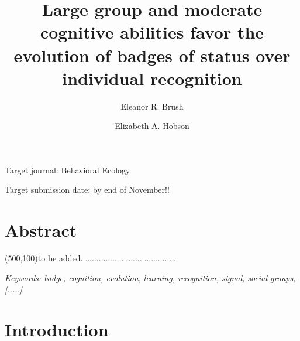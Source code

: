 

\noindent
\title{Large group and moderate cognitive abilities favor the evolution of badges of status over individual recognition} 

\author[1]{Eleanor R. Brush}
\author[2,3,4]{Elizabeth A. Hobson}
\maketitle

Target journal: Behavioral Ecology 

Target submission date: by end of November!!
\linenumbers

\section*{Abstract}

\framebox(500,100){to be added..........................................}

\textit{Keywords: badge, cognition, evolution, learning, recognition, signal, social groups,  [.....]}
\newline

\section*{Introduction} 


